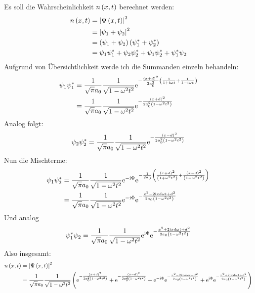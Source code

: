 \documentclass[11pt, ngerman, fleqn, DIV=15, headinclude]{scrartcl}
\begin{document}
Es soll die Wahrscheinlichkeit $n\left( x,t \right)$ berechnet werden:
\begin{align*}
	n\left( x,t \right)	&= \left| \Psi\left( x,t \right) \right|^2\\
				&= \left| \psi_1+\psi_2 \right|^2\\
				&= \left( \psi_1+\psi_2 \right)\left( \psi_1^*+\psi_2^* \right)\\
				&= \psi_1\psi^*_1+\psi_2\psi^*_2+\psi_1\psi^*_2+\psi^*_1\psi_2
\end{align*}
Aufgrund von Übersichtlichkeit werde ich die Summanden einzeln behandeln:
\begin{align*}
	\psi_1\psi^*_1	&= \frac1{\sqrt{\pi}a_0}\frac1{\sqrt{1-\omega^2t^2}}\mathrm e^{-\frac{\left( x+d \right)^2}{2a_0^2}\left( \frac1{1+\mathrm i\omega t}+\frac1{1-\mathrm i\omega t} \right)}\\
					&= \frac1{\sqrt{\pi}a_0}\frac1{\sqrt{1-\omega^2t^2}}\mathrm e^{-\frac{\left( x+d \right)^2}{2a_0^2\left( 1-\omega^2t^2 \right)}}\\
\end{align*}
Analog folgt:
\begin{align*}
	\psi_2\psi^*_2	&= \frac1{\sqrt{\pi}a_0}\frac1{\sqrt{1-\omega^2t^2}}\mathrm e^{-\frac{\left( x-d \right)^2}{2a_0^2\left( 1-\omega^2t^2 \right)}}\\
\end{align*}
Nun die Mischterme:
\begin{align*}
	\psi_1\psi^*_2	&= \frac1{\sqrt{\pi}a_0}\frac1{\sqrt{1-\omega^2t^2}}\mathrm e^{-\mathrm i\Phi}\mathrm e^{-\frac1{2a_0}\left( \frac{\left( x+d \right)^2}{\left( 1+\omega^2t^2 \right)}+\frac{\left( x-d \right)^2}{\left( 1-\omega^2t^2 \right)} \right)}\\
					&= \frac1{\sqrt{\pi}a_0}\frac1{\sqrt{1-\omega^2t^2}}\mathrm e^{-\mathrm i\Phi}\mathrm e^{-\frac{x^2-2\mathrm i xd\omega t+d^2}{2a_0\left( 1-\omega^2t^2 \right)}}\\
\end{align*}
Und analog
\begin{align*}
	\psi^*_1\psi_2	&= \frac1{\sqrt{\pi}a_0}\frac1{\sqrt{1-\omega^2t^2}}\mathrm e^{\mathrm i\Phi}\mathrm e^{-\frac{x^2+2\mathrm i xd\omega t+d^2}{2a_0\left( 1-\omega^2t^2 \right)}}\\
\end{align*}
Also insgesamt:
\begin{align*}
	n\left( x,t \right)	&= \left| \Psi\left( x,t \right) \right|^2\\
				&= \frac1{\sqrt{\pi}a_0}\frac1{\sqrt{1-\omega^2t^2}}\left( \mathrm e^{-\frac{\left( x+d \right)^2}{2a_0^2\left( 1-\omega^2t^2 \right)}}+\mathrm e^{-\frac{\left( x-d \right)^2}{2a_0^2\left( 1-\omega^2t^2 \right)}}+\mathrm e^{-\mathrm i\Phi}\mathrm e^{-\frac{x^2-2\mathrm i xd\omega t+d^2}{2a_0\left( 1-\omega^2t^2 \right)}}+\mathrm e^{\mathrm i\Phi}\mathrm e^{-\frac{x^2+2\mathrm i xd\omega t+d^2}{2a_0\left( 1-\omega^2t^2 \right)}} \right)
\end{align*}
\end{document}
